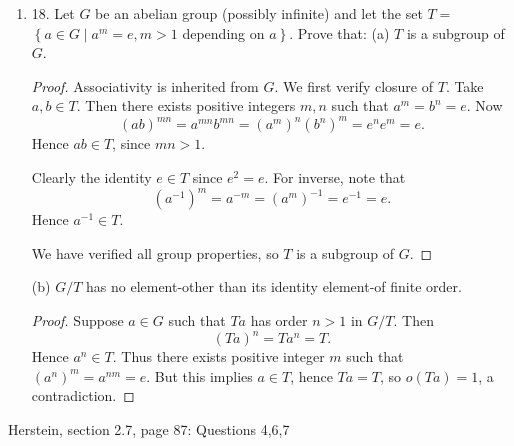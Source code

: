 \begin{enumerate}
\begin{proof}
	Now suppose $m | |P|$. We have $|P| = p^n m = |G|$, so $P = G$.
	Take some prime divisor $q>0$ such that $q | m$. Thus $q \mid |P|$.
	Then there exists an element $a \in G$ of order $q$ by Cauchy's Theorem. 
	Also, there exists $k$ such that $a^{p^k} = e$. Hence $q | p^k$. But it is assumed that $p \nmid m$, so we cannot have  $q | p^k$ (otherwise $q = p$, and $q | m$, so $p | m$ ), a contradiction. Therefore $m \nmid |P|$. Combining all we have,  we conclude $|P| = p^n$.
\end{proof}

\item 18. Let $G$ be an abelian group (possibly infinite) and let the set $T=$ $\left\{a \in G \mid a^m=e, m>1\right.$ depending on $\left.a\right\}$. Prove that:
(a) $T$ is a subgroup of $G$.
\begin{proof}
	Associativity is inherited from $G$. We first verify closure of $T$. Take $a, b \in T$. Then there exists positive integers $m, n$ such that $a^m = b^n = e$. Now \[
		(ab)^{mn} = a^{mn}b^{mn} = \left( a^m \right) ^n \left( b^n \right) ^m = e^ne^m = e
	.\] 
	Hence $ab \in T$, since $mn>1$. 

	Clearly the identity $e \in T$ since $e^2 = e$. For inverse, note that
	\[
		\left( a^{-1}  \right) ^m = a^{-m}
		=\left( a^m \right) ^{-1} = e^{-1} = e
	.\] 
	Hence $a^{-1}  \in T$.

	We have verified all group properties, so $T$ is a subgroup of $G$.
\end{proof}

(b) $G / T$ has no element-other than its identity element-of finite order.
\begin{proof}
	Suppose $a \in G$ such that $Ta$ has order $n > 1$ in $G / T$. Then \[
		(Ta)^n = Ta^n = T
	.\] 
	Hence $a^n \in T$. Thus there exists positive integer $m$ such that $\left( a^n \right) ^m =a^{nm}= e$. But this implies $a \in T$, hence $Ta = T$, so $o(Ta) = 1$, a contradiction.
\end{proof}

\end{enumerate}
\newpage
Herstein, section 2.7, page 87: Questions 4,6,7
